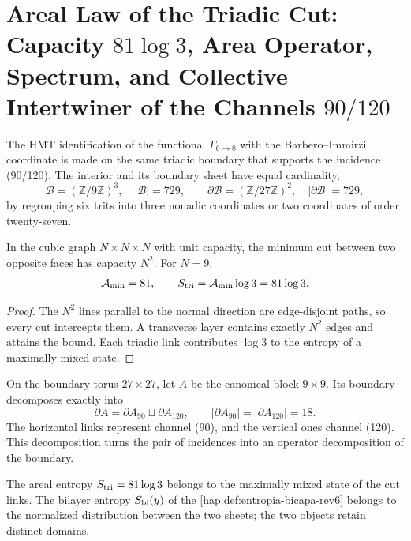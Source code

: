 \section{Areal Law of the Triadic Cut: Capacity \(81\log 3\), Area Operator, Spectrum, and Collective Intertwiner of the Channels \(90/120\)}
\label{hap:sec:area-entrelazamiento-barbero-rev11}

The HMT identification of the functional \(\Gamma_{6\to8}\) with the
Barbero--Immirzi coordinate is made on the same triadic boundary that supports the
incidence (90/120). The interior and its boundary sheet have equal cardinality,
\[
 \mathcal B=(\mathbb Z/9\mathbb Z)^3,
 \quad |\mathcal B|=729,
 \qquad
 \partial\mathcal B=(\mathbb Z/27\mathbb Z)^2,
 \quad |\partial\mathcal B|=729,
\]
by regrouping six trits into three nonadic coordinates or two
coordinates of order twenty-seven.

\begin{theorem}
\label{hap:thm:ley-areal-corte-triadico-rev11}
In the cubic graph \(N\times N\times N\) with unit capacity, the minimum
cut between two opposite faces has capacity \(N^2\). For \(N=9\),
\[
 \mathcal A_{\min}=81,
 \qquad S_{\rm tri}=\mathcal A_{\min}\log3=81\log3.
\]
\end{theorem}
\begin{proof}
The \(N^2\) lines parallel to the normal direction are edge-disjoint
paths, so every cut intercepts them. A transverse layer contains
exactly \(N^2\) edges and attains the bound. Each triadic link contributes
\(\log3\) to the entropy of a maximally mixed state.
\end{proof}

On the boundary torus \(27\times27\), let \(A\) be the canonical block
\(9\times9\). Its boundary decomposes exactly into
\begin{equation}
 \partial A=\partial A_{90}\sqcup\partial A_{120},
 \qquad |\partial A_{90}|=|\partial A_{120}|=18.
 \label{hap:eq:corte-90-120-rev11}
\end{equation}
The horizontal links represent channel (90), and the vertical ones
channel (120). This decomposition turns the pair of incidences into an
operator decomposition of the boundary.

The areal entropy \(S_{\rm tri}=81\log3\) belongs to the maximally
mixed state of the cut links. The bilayer entropy
\(S_{\rm bi}(y)\) of the \cref{hap:def:entropia-bicapa-rev6} belongs to the
normalized distribution between the two sheets; the two objects retain
distinct domains.


